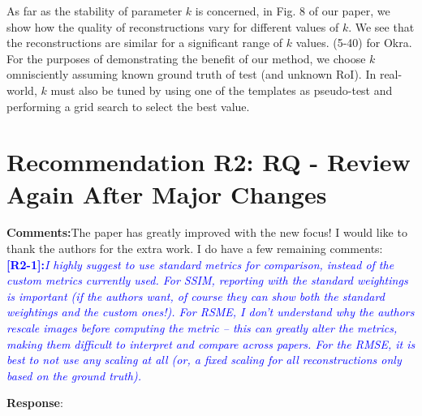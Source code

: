 \documentclass{article}
\begin{document}
As far as the stability of parameter $k$ is concerned, in Fig. 8 of our paper, we show how the quality of reconstructions vary for different values of $k$. We see that the reconstructions are similar for a significant range of $k$ values. (5-40) for Okra. For the purposes of demonstrating the benefit of our method, we choose $k$ omnisciently assuming known ground truth of test (and unknown RoI). In real-world, $k$ must also be tuned by using one of the templates as pseudo-test and performing a grid search to select the best value.\\


\section{Recommendation R2: RQ - Review Again After Major Changes}

\textbf{Comments:}The paper has greatly improved with the new focus! I would like to thank the authors for the extra work. I do have a few remaining comments:\\

\textcolor{blue}{\textbf{[R2-1]:}\textit{I highly suggest to use
    standard metrics for comparison, instead of the custom metrics
    currently used. For SSIM, reporting with the standard weightings
    is important (if the authors want, of course they can show both
    the standard weightings and the custom ones!). For RSME, I don't
    understand why the authors rescale images before computing the
    metric -- this can greatly alter the metrics, making them
    difficult to interpret and compare across papers. For the RMSE, it
    is best to not use any scaling at all (or, a fixed scaling for all
    reconstructions only based on the ground truth).  }}

\textbf{Response}:
\end{document}
